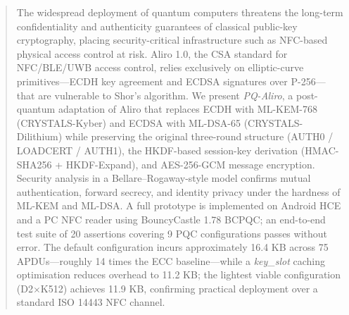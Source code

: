 \begin{abstract}
The widespread deployment of quantum computers threatens the long-term confidentiality and
authenticity guarantees of classical public-key cryptography, placing security-critical
infrastructure such as NFC-based physical access control at risk.
Aliro 1.0, the CSA standard for NFC/BLE/UWB access control, relies exclusively on
elliptic-curve primitives—ECDH key agreement and ECDSA signatures over P-256—that are
vulnerable to Shor's algorithm.
We present \emph{PQ-Aliro}, a post-quantum adaptation of Aliro that replaces ECDH with
ML-KEM-768 (CRYSTALS-Kyber) and ECDSA with ML-DSA-65 (CRYSTALS-Dilithium) while
preserving the original three-round structure (AUTH0 / LOADCERT / AUTH1), the HKDF-based
session-key derivation (HMAC-SHA256 + HKDF-Expand), and AES-256-GCM message encryption.
Security analysis in a Bellare--Rogaway-style model confirms mutual authentication,
forward secrecy, and identity privacy under the hardness of ML-KEM and ML-DSA.
A full prototype is implemented on Android HCE and a PC NFC reader using BouncyCastle 1.78
BCPQC; an end-to-end test suite of 20 assertions covering 9 PQC configurations passes
without error.
The default configuration incurs approximately 16.4 KB across 75 APDUs—roughly 14 times
the ECC baseline—while a \emph{key\_slot} caching optimisation reduces overhead to 11.2 KB;
the lightest viable configuration (D2$\times$K512) achieves 11.9 KB, confirming practical
deployment over a standard ISO 14443 NFC channel.
\end{abstract}

